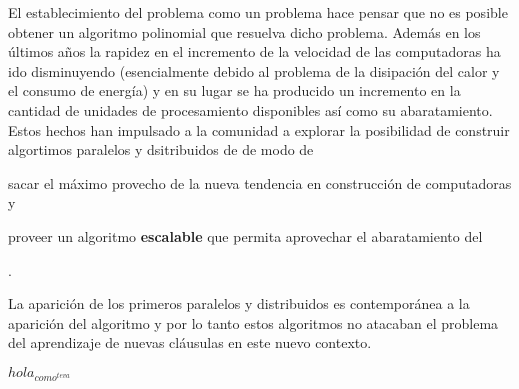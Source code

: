 El establecimiento del problema \sat como un problema \npc hace pensar que no es
posible obtener un algoritmo polinomial que resuelva dicho problema. Además en
los últimos años la rapidez en el incremento de la velocidad de las computadoras
ha ido disminuyendo (esencialmente debido al problema de la disipación del calor
y el consumo de energía) y en su lugar se ha producido un incremento en la
cantidad de unidades de procesamiento disponibles así como su abaratamiento.
Estos hechos han impulsado a la comunidad \sat a explorar la posibilidad de
construir algortimos paralelos y dsitribuidos de \ssolving de modo de
\begin{inparaenum}[a)] \item sacar el máximo provecho de la nueva tendencia en
construcción de computadoras y \item proveer un algoritmo \textbf{escalable} que
permita aprovechar el abaratamiento del \hard \end{inparaenum}.

La aparición de los primeros \ssolvers paralelos y distribuidos
\cite{bohm:1996:afast, zhang:jsc-1996} es contemporánea a la aparición del
algoritmo \CDCL y por lo tanto estos algoritmos no atacaban el problema del
aprendizaje de nuevas cláusulas en este nuevo contexto.

$hola_{como^{te va}}$
